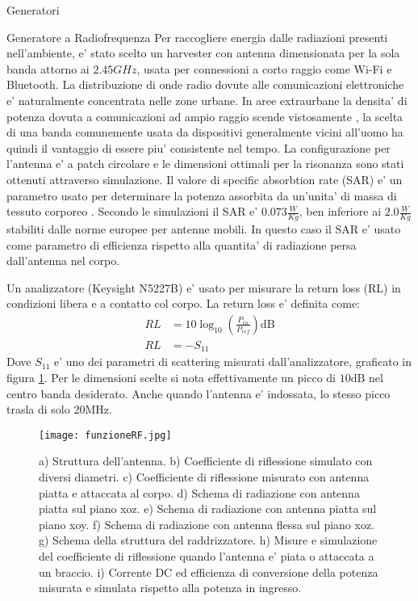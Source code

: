 \begin{section}{Generatori}
    \begin{subsection}{Generatore a Radiofrequenza}
        Per raccogliere energia dalle radiazioni presenti nell'ambiente, e' stato scelto un harvester con antenna dimensionata per la sola banda attorno ai \(2.45GHz\), usata per connessioni a corto raggio come Wi-Fi e Bluetooth. La distribuzione di onde radio dovute alle comunicazioni elettroniche e' naturalmente concentrata nelle zone urbane. In aree extraurbane la densita' di potenza dovuta a comunicazioni ad ampio raggio scende vistosamente \cite{ibrahimRadioFrequencyEnergy2022}, la scelta di una banda comunemente usata da dispositivi generalmente vicini all'uomo ha quindi il vantaggio di essere piu' consistente nel tempo. La configurazione per l'antenna e' a patch circolare e le dimensioni ottimali per la risonanza sono stati ottenuti attraverso simulazione. Il valore di specific absorbtion rate (SAR) e' un parametro usato per determinare la potenza assorbita da un'unita' di massa di tessuto corporeo \cite{vallozzi26LatestDevelopments2016}. Secondo le simulazioni il SAR e' \(0.073\frac{W}{Kg}\), ben inferiore ai \(2.0\frac{W}{Kg}\) stabiliti dalle norme europee per antenne mobili. In questo caso il SAR e' usato come parametro di efficienza rispetto alla quantita' di radiazione persa dall'antenna nel corpo. 


        {\color{red}
        Un analizzatore (Keysight N5227B) e' usato per misurare la return loss (RL) in condizioni libera e a contatto col corpo. 
        La return loss e' definita come:
        \begin{equation*}
            \begin{aligned}
            RL&=10\log_{10}\left( \frac{P_{in}}{P_{ref}} \right) \mathrm{dB}\\
            RL&=-S_{11}
            \end{aligned}
        \end{equation*}
        Dove \(S_{11}\) e' uno dei parametri di scattering misurati dall'analizzatore, graficato in figura \ref{fig:funzioneRF}. Per le dimensioni scelte si nota effettivamente un picco di \(10\mathrm{dB}\) nel centro banda desiderato. Anche quando l'antenna e' indossata, lo stesso picco trasla di solo \(20\mathrm{MHz}\).
        }

        \begin{figure}[hbt!]
            \texttt{[image: funzioneRF.jpg]}
            \centering
            \caption{a) Struttura dell'antenna. b) Coefficiente di riflessione simulato con diversi diametri. c) Coefficiente di riflessione misurato con antenna piatta e attaccata al corpo. d) Schema di radiazione con antenna piatta sul piano xoz. e) Schema di radiazione con antenna piatta sul piano xoy. f) Schema di radiazione con antenna flessa sul piano xoz. g) Schema della struttura del raddrizzatore. h) Misure e simulazione del coefficiente di riflessione quando l'antenna e' piata o attaccata a un braccio. i) Corrente DC ed efficienza di conversione della potenza misurata e simulata rispetto alla potenza in ingresso.\cite{kouWearableAllFabricHybrid2024}}
            \label{fig:funzioneRF}
        \end{figure}
        

\end{subsection}
\end{section}

